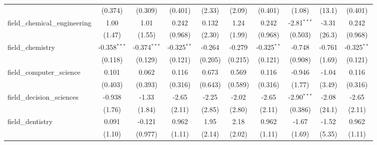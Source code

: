 \begin{tabular}{lccccccccc}
                                                               & (0.374)        & (0.309)        & (0.401)       & (2.33)        & (2.09)        & (0.401)       & (1.08)        & (13.1)  & (0.401)\\   
   field\_chemical\_engineering                                & 1.00           & 1.01           & 0.242         & 0.132         & 1.24          & 0.242         & -2.81$^{***}$ & -3.31   & 0.242\\   
                                                               & (1.47)         & (1.55)         & (0.968)       & (2.30)        & (1.99)        & (0.968)       & (0.503)       & (26.3)  & (0.968)\\   
   field\_chemistry                                            & -0.358$^{***}$ & -0.374$^{***}$ & -0.325$^{**}$ & -0.264        & -0.279        & -0.325$^{**}$ & -0.748        & -0.761  & -0.325$^{**}$\\   
                                                               & (0.118)        & (0.129)        & (0.121)       & (0.205)       & (0.215)       & (0.121)       & (0.908)       & (1.69)  & (0.121)\\   
   field\_computer\_science                                    & 0.101          & 0.062          & 0.116         & 0.673         & 0.569         & 0.116         & -0.946        & -1.04   & 0.116\\   
                                                               & (0.403)        & (0.393)        & (0.316)       & (0.643)       & (0.589)       & (0.316)       & (1.77)        & (3.49)  & (0.316)\\   
   field\_decision\_sciences                                   & -0.938         & -1.33          & -2.65         & -2.25         & -2.02         & -2.65         & -2.90$^{***}$ & -2.08   & -2.65\\   
                                                               & (1.76)         & (1.84)         & (2.11)        & (2.85)        & (2.80)        & (2.11)        & (0.386)       & (24.1)  & (2.11)\\   
   field\_dentistry                                            & 0.091          & -0.121         & 0.962         & 1.95          & 2.18          & 0.962         & -1.67         & -1.52   & 0.962\\   
                                                               & (1.10)         & (0.977)        & (1.11)        & (2.14)        & (2.02)        & (1.11)        & (1.69)        & (5.35)  & (1.11)\\   

\end{tabular}
